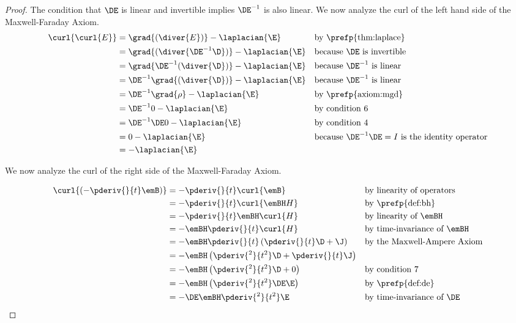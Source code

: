 \begin{proof}
The condition that $\DE$ is linear and invertible implies $\DE^{-1}$ is also linear.
We now analyze the curl of the left hand side of the Maxwell-Faraday Axiom.
\begin{align*}
   \curl{\curl{E}}
     &= \grad{(\diver{E})} - \laplacian{\E}
     && \text{by \prefp{thm:laplace}}
   \\&= \grad{(\diver{\DE^{-1}\D})} - \laplacian{\E}
     && \text{because $\DE$ is invertible}
   \\&= \grad{\DE^{-1}(\diver{\D})} - \laplacian{\E}
     && \text{because $\DE^{-1}$ is linear}
   \\&= \DE^{-1}\grad{(\diver{\D})} - \laplacian{\E}
     && \text{because $\DE^{-1}$ is linear}
   \\&= \DE^{-1}\grad{\rho} - \laplacian{\E}
     && \text{by \prefp{axiom:mgd}}
   \\&= \DE^{-1}0 - \laplacian{\E}
     && \text{by condition 6}
   \\&= \DE^{-1}\DE 0 - \laplacian{\E}
     && \text{by condition 4}
   \\&= 0 - \laplacian{\E}
     && \text{because $\DE^{-1}\DE=I$ is the identity operator}
   \\ &= - \laplacian{\E}
\end{align*}


We now analyze the curl of the right side of the Maxwell-Faraday Axiom.


\begin{align*}
   \curl{\left( -\pderiv{}{t}\emB \right)}
     &= -\pderiv{}{t}\curl{\emB}
     && \text{by linearity of operators}
   \\&= -\pderiv{}{t}\curl{\emBH H}
     &&\text{by \prefp{def:bh}}
   \\&= -\pderiv{}{t}\emBH \curl{H}
     && \text{by linearity of $\emBH$}
   \\&= -\emBH \pderiv{}{t} \curl{H}
     && \text{by time-invariance of $\emBH$}
   \\&= -\emBH \pderiv{}{t} \left( \pderiv{}{t}\D + \J   \right)
     && \text{by the Maxwell-Ampere Axiom}
   \\&= -\emBH \left( \pderiv{^2}{t^2}\D + \pderiv{}{t}\J   \right)
   \\&= -\emBH \left( \pderiv{^2}{t^2}\D + 0  \right)
     && \text{by condition 7}
   \\&= -\emBH \left( \pderiv{^2}{t^2}\DE\E  \right)
     && \text{by \prefp{def:de}}
   \\&= -\DE \emBH \pderiv{^2}{t^2}\E
     && \text{by time-invariance of $\DE$ }
\end{align*}




\end{proof}
